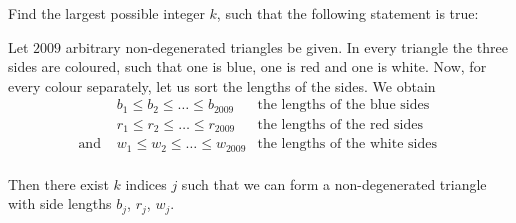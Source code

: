 Find the largest possible integer $k$,  such that the following statement is true:

Let $2009$ arbitrary non-degenerated triangles be given. In every triangle the three sides are coloured, such that one is blue, one is red and one is white. Now, for every colour separately, let us sort the lengths of the sides. We obtain\[ \left. \begin{array}{rcl}

 & b_1 \leq b_2\leq\ldots\leq b_{2009} & \textrm{the lengths of the blue sides }\\

 & r_1 \leq r_2\leq\ldots\leq r_{2009} & \textrm{the lengths of the red sides }\\

 \textrm{and } & w_1 \leq w_2\leq\ldots\leq w_{2009} & \textrm{the lengths of the white sides }\\

 \end{array}\right.\]

Then there exist $k$ indices $j$ such that we can form a non-degenerated triangle with side lengths $b_j$,  $r_j$,  $w_j$.